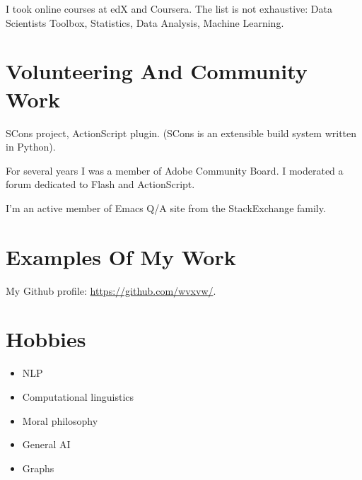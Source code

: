 \documentclass[11pt]{article}
\begin{document}
I took online courses at edX and Coursera.  The list is not exhaustive: 
Data Scientists Toolbox, Statistics, Data Analysis, Machine Learning.

\section{Volunteering And Community Work}
\label{sec:orgheadline14}
SCons project, ActionScript plugin.  (SCons is an extensible build system
written in Python).

For several years I was a member of Adobe Community Board.  I moderated a
forum dedicated to Flash and ActionScript.

I'm an active member of Emacs Q/A site from the StackExchange family.

\section{Examples Of My Work}
\label{sec:orgheadline15}
My Github profile:
\url{https://github.com/wvxvw/}.

\section{Hobbies}
\label{sec:orgheadline16}
\begin{itemize}
\item NLP
\item Computational linguistics
\item Moral philosophy
\item General AI
\item Graphs
\end{itemize}
\end{document}
